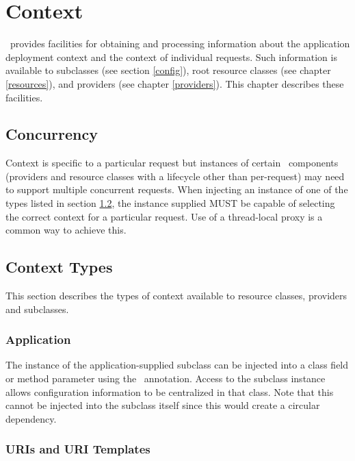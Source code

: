 \chapter{Context}
\label{context}

\jaxrs\ provides facilities for obtaining and processing information about the application deployment context and the context of individual requests. Such information is available to  subclasses (see section \ref{config}), root resource classes (see chapter \ref{resources}), and providers (see chapter \ref{providers}). This chapter describes these facilities.

\section{Concurrency}

Context is specific to a particular request but instances of certain \jaxrs\ components (providers and resource classes with a lifecycle other than per-request) may need to support multiple concurrent requests. When injecting an instance of one of the types listed in section \ref{contexttypes}, the instance supplied MUST be capable of selecting the correct context for a particular request. Use of a thread-local proxy is a common way to achieve this.

\section{Context Types}
\label{contexttypes}

This section describes the types of context available to resource classes, providers and  subclasses.

\subsection{Application}

The instance of the application-supplied  subclass can be injected into a class field or method parameter using the \Context\ annotation. Access to the  subclass instance allows configuration information to be centralized in that class. Note that this cannot be injected into the  subclass itself since this would create a circular dependency.

\subsection{URIs and URI Templates}

